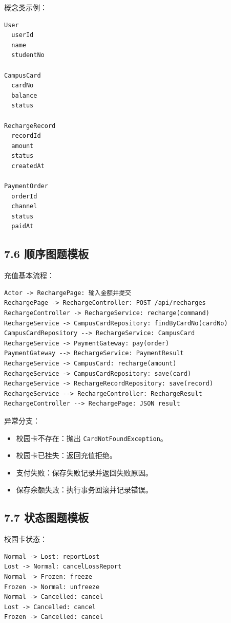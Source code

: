 \documentclass[UTF8,zihao=-4]{ctexart}
\begin{document}
概念类示例：

\small
\begin{verbatim}
User
  userId
  name
  studentNo

CampusCard
  cardNo
  balance
  status

RechargeRecord
  recordId
  amount
  status
  createdAt

PaymentOrder
  orderId
  channel
  status
  paidAt
\end{verbatim}
\normalsize

\subsection{7.6 顺序图题模板}

充值基本流程：

\small
\begin{verbatim}
Actor -> RechargePage: 输入金额并提交
RechargePage -> RechargeController: POST /api/recharges
RechargeController -> RechargeService: recharge(command)
RechargeService -> CampusCardRepository: findByCardNo(cardNo)
CampusCardRepository --> RechargeService: CampusCard
RechargeService -> PaymentGateway: pay(order)
PaymentGateway --> RechargeService: PaymentResult
RechargeService -> CampusCard: recharge(amount)
RechargeService -> CampusCardRepository: save(card)
RechargeService -> RechargeRecordRepository: save(record)
RechargeService --> RechargeController: RechargeResult
RechargeController --> RechargePage: JSON result
\end{verbatim}
\normalsize

异常分支：

\begin{itemize}
\item 校园卡不存在：抛出 \texttt{CardNotFoundException}。
\item 校园卡已挂失：返回充值拒绝。
\item 支付失败：保存失败记录并返回失败原因。
\item 保存余额失败：执行事务回滚并记录错误。
\end{itemize}

\subsection{7.7 状态图题模板}

校园卡状态：

\small
\begin{verbatim}
Normal -> Lost: reportLost
Lost -> Normal: cancelLossReport
Normal -> Frozen: freeze
Frozen -> Normal: unfreeze
Normal -> Cancelled: cancel
Lost -> Cancelled: cancel
Frozen -> Cancelled: cancel
\end{verbatim}
\normalsize
\end{document}
